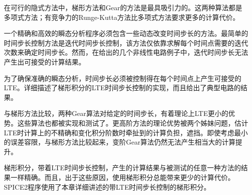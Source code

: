 在可行的隐式方法中，梯形方法和Gear的方法是最具吸引力的。这两种算法都是多项式方法；有竞争力的Runge-Kutta方法比多项式方法要求更多的计算代价。

一个精确和高效的瞬态分析程序必须包含一些动态改变时间步长的方法。最简单的时间步长控制方法是迭代时间步长控制，该方法仅依靠求解每个时间点需要的迭代次数来确定时间步长。然而，在给出的几个非线性电路例子中，迭代时间步长无法产生出可接受的计算结果。

为了确保准确的瞬态分析，时间步长必须被控制得在每个时间点上产生可接受的LTE。详细描述了梯形积分的LTE时间步长控制的实现，而且给出了典型电路的结果。

与梯形方法比较，两种Gear算法对给定的时间步长，有着理论上LTE更小的优势。这些算法也都被实现和测试了。更高阶方法的理论优势被两个姊妹问题，估计LTE时计算上的不精确和变化积分阶数时牵扯到的计算负担，遮挡。即使考虑最小的误差容限，与梯形方法比较起来，变阶Gear算法仍然无法产生相当大的计算提升。

梯形积分，带着LTE时间步长控制，产生的计算结果与被测试的任意一种方法的结果一样精确。而且，出于这些原因，使用梯形积分总能带来更少的计算代价。SPICE2程序使用了本章详细讲述的带LTE时间步长控制的梯形积分。